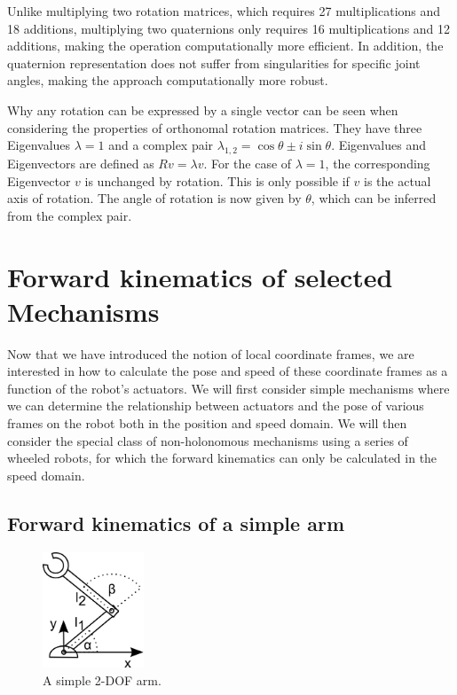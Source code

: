 Unlike multiplying two rotation matrices, which requires 27 multiplications and 18 additions, multiplying two quaternions only requires 16 multiplications and 12 additions, making the operation computationally more efficient. In addition, the quaternion representation does not suffer from singularities for specific joint angles, making the approach computationally more robust. 

Why any rotation can be expressed by a single vector can be seen when considering the properties of orthonomal rotation matrices. They have three Eigenvalues $\lambda=1$ and a complex pair $\lambda_{1,2}=\cos \theta \pm i \sin \theta$. Eigenvalues and Eigenvectors are defined as $Rv=\lambda v$. For the case of $\lambda=1$, the corresponding Eigenvector $v$ is unchanged by rotation. This is only possible if $v$ is the actual axis of rotation. The angle of rotation is now given by $\theta$, which can be inferred from the complex pair.  

\section{Forward kinematics of selected Mechanisms}
Now that we have introduced the notion of local coordinate frames, we are interested in how to calculate the pose and speed of these coordinate frames as a function of the robot's actuators. We will first consider simple mechanisms where we can determine the relationship between actuators and the pose of various frames on the robot both in the position and speed domain. We will then consider the special class of non-holonomous mechanisms using a series of wheeled robots, for which the forward kinematics can only be calculated in the speed domain. 

\subsection{Forward kinematics of a simple arm}
\begin{figure}[!htb]%
  \begin{center}
    \includegraphics[width=0.27\textwidth]{figs/fwk2dofarm}
  \end{center}
  \caption{A simple 2-DOF arm.\label{fig:fwk2dofarm}}
\end{figure}

